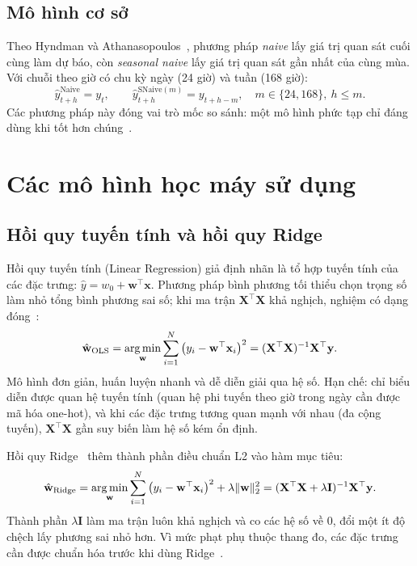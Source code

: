 \documentclass[../main.tex]{subfiles}
\begin{document}
\subsection{Mô hình cơ sở}
Theo Hyndman và Athanasopoulos~\cite[mục 5.2]{hyndman2021fpp3}, phương pháp \textit{naive} lấy giá trị quan sát cuối cùng làm dự báo, còn \textit{seasonal naive} lấy giá trị quan sát gần nhất của cùng mùa. Với chuỗi theo giờ có chu kỳ ngày (24 giờ) và tuần (168 giờ):
\begin{equation}
\hat{y}^{\text{Naive}}_{t+h} = y_t, \qquad
\hat{y}^{\text{SNaive}(m)}_{t+h} = y_{t+h-m}, \quad m \in \{24, 168\},\ h \le m.
\end{equation}
Các phương pháp này đóng vai trò mốc so sánh: một mô hình phức tạp chỉ đáng dùng khi tốt hơn chúng~\cite{hyndman2021fpp3}.

\section{Các mô hình học máy sử dụng}

\subsection{Hồi quy tuyến tính và hồi quy Ridge}
Hồi quy tuyến tính (Linear Regression) giả định nhãn là tổ hợp tuyến tính của các đặc trưng: $\hat{y} = w_0 + \mathbf{w}^{\top}\mathbf{x}$. Phương pháp bình phương tối thiểu chọn trọng số làm nhỏ tổng bình phương sai số; khi ma trận $\mathbf{X}^{\top}\mathbf{X}$ khả nghịch, nghiệm có dạng đóng~\cite{hastie2009elements}:
\begin{equation}
\hat{\mathbf{w}}_{\text{OLS}} = \operatorname*{arg\,min}_{\mathbf{w}} \sum_{i=1}^{N} \big(y_i - \mathbf{w}^{\top}\mathbf{x}_i\big)^2 = (\mathbf{X}^{\top}\mathbf{X})^{-1}\mathbf{X}^{\top}\mathbf{y}.
\end{equation}
Mô hình đơn giản, huấn luyện nhanh và dễ diễn giải qua hệ số. Hạn chế: chỉ biểu diễn được quan hệ tuyến tính (quan hệ phi tuyến theo giờ trong ngày cần được mã hóa one-hot), và khi các đặc trưng tương quan mạnh với nhau (đa cộng tuyến), $\mathbf{X}^{\top}\mathbf{X}$ gần suy biến làm hệ số kém ổn định.

Hồi quy Ridge~\cite{hoerl1970ridge} thêm thành phần điều chuẩn L2 vào hàm mục tiêu:
\begin{equation}
\hat{\mathbf{w}}_{\text{Ridge}} = \operatorname*{arg\,min}_{\mathbf{w}} \sum_{i=1}^{N} \big(y_i - \mathbf{w}^{\top}\mathbf{x}_i\big)^2 + \lambda \lVert \mathbf{w} \rVert_2^2 = (\mathbf{X}^{\top}\mathbf{X} + \lambda \mathbf{I})^{-1}\mathbf{X}^{\top}\mathbf{y}.
\end{equation}
Thành phần $\lambda \mathbf{I}$ làm ma trận luôn khả nghịch và co các hệ số về 0, đổi một ít độ chệch lấy phương sai nhỏ hơn. Vì mức phạt phụ thuộc thang đo, các đặc trưng cần được chuẩn hóa trước khi dùng Ridge~\cite[mục 3.4]{hastie2009elements}.
\end{document}
